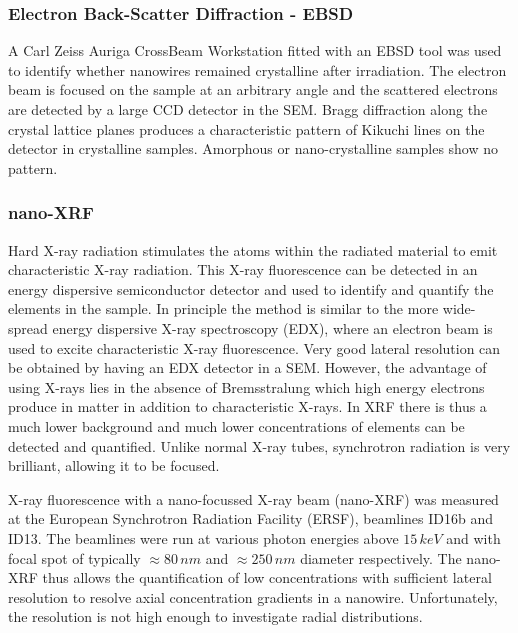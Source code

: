 \subsubsection{Electron Back-Scatter Diffraction - EBSD}

A Carl Zeiss Auriga CrossBeam Workstation fitted with an EBSD tool was used to identify whether nanowires remained crystalline after irradiation. The electron beam is focused on the sample at an arbitrary angle and the scattered electrons are detected by a large CCD detector in the SEM. Bragg diffraction along the crystal lattice planes produces a characteristic pattern of Kikuchi lines on the detector \cite{kikuchi_diffraction_1928,fultz_transmission_2013} in crystalline samples. Amorphous or nano-crystalline samples show no pattern.

\subsubsection{nano-XRF}

Hard X-ray radiation stimulates the atoms within the radiated material to emit characteristic X-ray radiation. This X-ray fluorescence can be detected in an energy dispersive semiconductor detector and used to identify and quantify the elements in the sample. In principle the method is similar to the more wide-spread energy dispersive X-ray spectroscopy (EDX), where an electron beam is used to excite characteristic X-ray fluorescence. Very good lateral resolution can be obtained by having an EDX detector in a SEM. However, the advantage of using X-rays lies in the absence of Bremsstralung which high energy electrons produce in matter in addition to characteristic X-rays. In XRF there is thus a much lower background and much lower concentrations of elements can be detected and quantified. Unlike normal X-ray tubes, synchrotron radiation is very brilliant, allowing it to be focused. 

X-ray fluorescence with a nano-focussed X-ray beam (nano-XRF) was measured at the European Synchrotron Radiation Facility (ERSF), beamlines ID16b and ID13. The beamlines were run at various photon energies above $15\,keV$ and with focal spot of typically $\approx 80\,nm$ and $\approx 250\,nm$ diameter respectively. The nano-XRF thus allows the quantification of low concentrations with sufficient lateral resolution to resolve axial concentration gradients in a nanowire. Unfortunately, the resolution is not high enough to investigate radial distributions. 

